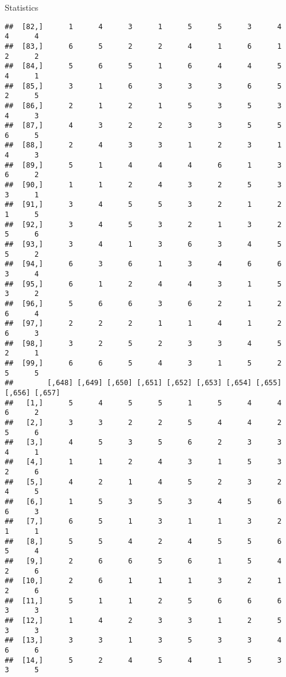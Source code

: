 \documentclass[
  ignorenonframetext,
]{beamer}
\begin{document}
\begin{frame}[fragile]{Statistics}
\begin{verbatim}
##  [82,]      1      4      3      1      5      5      3      4      4      4
##  [83,]      6      5      2      2      4      1      6      1      2      2
##  [84,]      5      6      5      1      6      4      4      5      4      1
##  [85,]      3      1      6      3      3      3      6      5      2      5
##  [86,]      2      1      2      1      5      3      5      3      4      3
##  [87,]      4      3      2      2      3      3      5      5      6      5
##  [88,]      2      4      3      3      1      2      3      1      4      3
##  [89,]      5      1      4      4      4      6      1      3      6      2
##  [90,]      1      1      2      4      3      2      5      3      3      1
##  [91,]      3      4      5      5      3      2      1      2      1      5
##  [92,]      3      4      5      3      2      1      3      2      5      6
##  [93,]      3      4      1      3      6      3      4      5      5      2
##  [94,]      6      3      6      1      3      4      6      6      3      4
##  [95,]      6      1      2      4      4      3      1      5      3      2
##  [96,]      5      6      6      3      6      2      1      2      6      4
##  [97,]      2      2      2      1      1      4      1      2      6      3
##  [98,]      3      2      5      2      3      3      4      5      2      1
##  [99,]      6      6      5      4      3      1      5      2      5      5
##        [,648] [,649] [,650] [,651] [,652] [,653] [,654] [,655] [,656] [,657]
##   [1,]      5      4      5      5      1      5      4      4      6      2
##   [2,]      3      3      2      2      5      4      4      2      5      6
##   [3,]      4      5      3      5      6      2      3      3      4      1
##   [4,]      1      1      2      4      3      1      5      3      2      6
##   [5,]      4      2      1      4      5      2      3      2      4      5
##   [6,]      1      5      3      5      3      4      5      6      6      3
##   [7,]      6      5      1      3      1      1      3      2      1      1
##   [8,]      5      5      4      2      4      5      5      6      5      4
##   [9,]      2      6      6      5      6      1      5      4      2      6
##  [10,]      2      6      1      1      1      3      2      1      2      6
##  [11,]      5      1      1      2      5      6      6      6      3      3
##  [12,]      1      4      2      3      3      1      2      5      3      3
##  [13,]      3      3      1      3      5      3      3      4      6      6
##  [14,]      5      2      4      5      4      1      5      3      3      5

\end{verbatim}
\end{frame}
\end{document}
